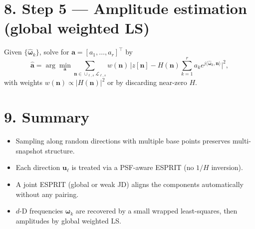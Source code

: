 \documentclass[11pt,a4paper]{article}
\begin{document}
\section*{8. Step 5 — Amplitude estimation (global weighted LS)}

Given $\{\widehat{\boldsymbol{\omega}}_k\}$, solve for $\mathbf{a} = [a_1,\dots,a_r]^\top$ by
\begin{equation}
\widehat{\mathbf{a}} 
= \arg\min_{\mathbf{a}}
\sum_{\mathbf{n}\in \cup_{\ell,s}\mathcal{L}_{\ell,s}} 
w(\mathbf{n})\,
\Big|z[\mathbf{n}] - 
H(\mathbf{n})\sum_{k=1}^{r} a_k e^{j\langle \widehat{\boldsymbol{\omega}}_k, \mathbf{n}\rangle}\Big|^2,
\end{equation}
with weights $w(\mathbf{n}) \propto |H(\mathbf{n})|^2$ or by discarding near-zero $H$.

\section*{9. Summary}

\begin{itemize}
  \item Sampling along random directions with multiple base points preserves 
  multi-snapshot structure.
  \item Each direction $\mathbf{u}_\ell$ is treated via a PSF-aware ESPRIT 
  (no $1/H$ inversion).
  \item A joint ESPRIT (global or weak JD) aligns the components automatically 
  without any pairing.
  \item $d$-D frequencies $\boldsymbol{\omega}_k$ are recovered by a small 
  wrapped least-squares, then amplitudes by global weighted LS.
\end{itemize}
\end{document}
